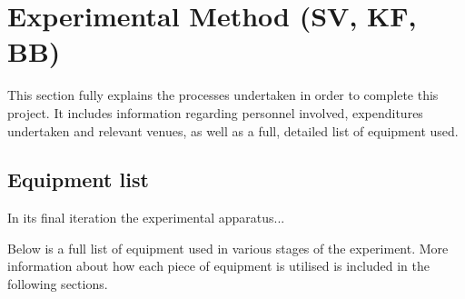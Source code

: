 \section{Experimental Method (SV, KF, BB)}

This section fully explains the processes undertaken in order to complete this project. It includes  information regarding personnel involved, expenditures undertaken and relevant venues, as well as a full, detailed list of equipment used.

\subsection{Equipment list}

In its final iteration the experimental apparatus...

Below is a full list of equipment used in various stages of the experiment. More information about how each piece of equipment is utilised is included in the following sections.
\bigskip
